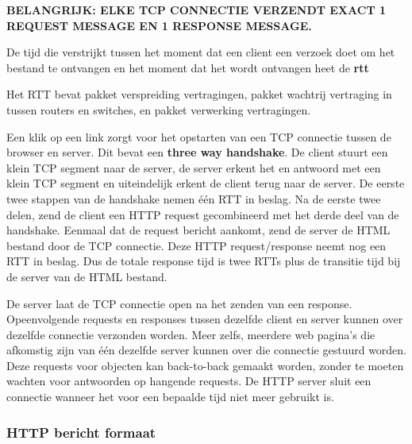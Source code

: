 \noindent \textbf{BELANGRIJK: ELKE TCP CONNECTIE VERZENDT EXACT 1 REQUEST MESSAGE EN 1 RESPONSE MESSAGE.}

\noindent De tijd die verstrijkt tussen het moment dat een client een verzoek doet om het bestand te ontvangen en het moment dat het wordt ontvangen heet de \textbf{\acrfull{rtt}}

\noindent Het RTT bevat pakket verspreiding vertragingen, pakket wachtrij vertraging in tussen routers en switches, en pakket verwerking vertragingen.

\noindent Een klik op een link zorgt voor het opstarten van een TCP connectie tussen de browser en server. Dit bevat een \textbf{three way handshake}. De client stuurt een klein TCP segment naar de server, de server erkent het en antwoord met een klein TCP segment en uiteindelijk erkent de client terug naar de server. De eerste twee stappen van de handshake nemen één RTT in beslag. Na de eerste twee delen, zend de client een HTTP request gecombineerd met het derde deel van de handshake. Eenmaal dat de request bericht aankomt, zend de server de HTML bestand door de TCP connectie. Deze HTTP request/response neemt nog een RTT in beslag. Dus de totale response tijd is twee RTTs plus de transitie tijd bij de server van de HTML bestand.

\newpage


De server laat de TCP connectie open na het zenden van een response. Opeenvolgende requests en responses tussen dezelfde client en server kunnen over dezelfde connectie verzonden worden. Meer zelfs, meerdere web pagina’s die afkomstig zijn van één dezelfde server kunnen over die connectie gestuurd worden. Deze requests voor objecten kan back-to-back gemaakt worden, zonder te moeten wachten voor antwoorden op hangende requests. De HTTP server sluit een connectie wanneer het voor een bepaalde tijd niet meer gebruikt is.

\subsubsection{HTTP bericht formaat}


